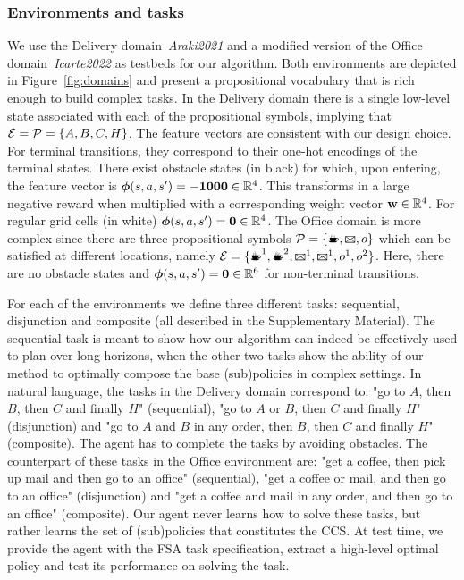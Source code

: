 \subsubsection{Environments and tasks} We use the Delivery domain~\textit{Araki2021} and a modified version of the Office domain~\textit{Icarte2022} as testbeds for our algorithm. Both environments are depicted in Figure~\ref{fig:domains} and present a propositional vocabulary that is rich enough to build complex tasks. In the Delivery domain there is a single low-level state associated with each of the propositional symbols, implying that ${\mathcal{E}=\mathcal{P}=\{A,B,C, H\}}$. The feature vectors are consistent with our design choice. For terminal transitions, they correspond to their one-hot encodings of the terminal states. There exist obstacle states (in black) for which, upon entering,  the feature vector is $\boldsymbol{\phi}(s,a,s')=\mathbf{-1000}\in\mathbb{R}^4$. This transforms in a large negative reward when multiplied with a corresponding weight vector $\mathbf{w}\in\mathbb{R}^{4}$. For regular grid cells (in white) $\boldsymbol{\phi}(s,a,s')=\mathbf{0}\in\mathbb{R}^{4}$. The Office domain is more complex since there are three propositional symbols $\cP=\{\text{\coffee}, \text{\mail}, o\}$ which can be satisfied at different locations, namely $\cE=\{\text{\coffee}^1, \text{\coffee}^2, \text{\mail}^1, \text{\mail}^1, o^1, o^2\}$. Here, there are no obstacle states and $\boldsymbol{\phi}(s,a,s')=\mathbf{0}\in\mathbb{R}^6$ for non-terminal transitions.

For each of the environments we define three different tasks: sequential, disjunction and composite (all described in the Supplementary Material). The sequential task is meant to show how our algorithm can indeed be effectively used to plan over long horizons, when the other two tasks show the ability of our method to optimally compose the base (sub)policies in complex settings. In natural language, the tasks in the Delivery domain correspond to: "go to $A$, then $B$, then $C$ and finally $H$"  (sequential), "go to $A$ or $B$, then $C$ and finally $H$" (disjunction) and "go to $A$ and $B$ in any order, then $B$, then $C$ and finally $H$" (composite). The agent has to complete the tasks by avoiding obstacles. The counterpart of these tasks in the Office environment are: "get a coffee, then pick up mail and then go to an office" (sequential), "get a coffee or mail, and then go to an office" (disjunction) and "get a coffee and mail in any order, and then go to an office" (composite). 
Our agent never learns how to solve these tasks, but rather learns the set of (sub)policies that constitutes the CCS. At test time, we provide the agent with the FSA task specification, extract a high-level optimal policy and test its performance on solving the task.

